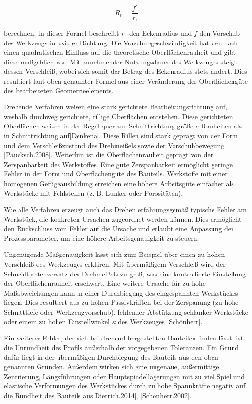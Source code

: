 \begin{equation*}
	R_{t}=\frac{f^{2}}{r_{\epsilon}}
\end{equation*}

berechnen. In dieser Formel beschreibt $r_{\epsilon}$ den Eckenradius und $f$ den Vorschub des Werkzeugs in axialer Richtung. Die Vorschubgeschwindigkeit hat demnach einen quadratischen Einfluss auf die theoretische Oberflächenrauheit und gibt diese maßgeblich vor. Mit zunehmender Nutzungsdauer des Werkzeuges steigt dessen Verschleiß, wobei sich somit der Betrag des Eckenradius stets ändert. Dies resultiert laut oben genannter Formel aus einer Veränderung der Oberflächengüte des bearbeiteten Geometrieelements. 

Drehende Verfahren weisen eine stark gerichtete Bearbeitungsrichtung auf, weshalb durchweg gerichtete, rillige Oberflächen entstehen. Diese gerichteten Oberflächen weisen in der Regel quer zur Schnittrichtung größere Rauheiten als in Schnittrichtung auf[Denkena].
Diese Rillen sind stark geprägt von der Form und dem Verschleißzustand des Drehmeißels sowie der Vorschubbewegung [Paucksch.2008].
Weiterhin ist die Oberflächenrauheit geprägt von der Zerspanbarkeit des Werkstoffes. Eine gute Zerspanbarkeit ermöglicht geringe Fehler in der Form und Oberflächengüte des Bauteils. Werkstoffe mit einer homogenen Gefügeausbildung erreichen eine höhere Arbeitsgüte einfacher als Werkstücke mit Fehlstellen (z. B. Lunker oder Porositäten).

Wie alle Verfahren erzeugt auch das Drehen erfahrungsgemäß typische Fehler am Werkstück, die konkreten Ursachen zugeordnet werden können. Dies ermöglicht den Rückschluss vom Fehler auf die Ursache und erlaubt eine Anpassung der Prozessparameter, um eine höhere Arbeitsgenauigkeit zu steuern. 

Ungenügende Maßgenauigkeit lässt sich zum Beispiel über einen zu hohen Verschleiß des Werkzeuges erklären. Mit übermäßigem Verschleiß wird der Schneidkantenversatz des Drehmeißels zu groß, was eine kontrollierte Einstellung der Oberflächenrauheit erschwert. Eine weitere Ursache für zu hohe Maßabweichungen kann in einer Durchbiegung des eingespannten Werkstückes liegen. Dies resultiert aus zu hohen Passivkräften bei der Zerspanung (zu hohe Schnitttiefe oder Werkzeugvorschub), fehlender Abstützung schlanker Werkstücke oder einem zu hohen Einstellwinkel $\kappa$ des Werkzeuges [Schönherr].

Ein weiterer Fehler, der sich bei drehend hergestellten Bauteilen finden lässt, ist die Unrundheit des Profils außerhalb der vorgegebenen Toleranzen. Ein Grund dafür liegt in der übermäßigen Durchbiegung des Bauteils aus den oben genannten Gründen. Außerdem wirken sich eine ungenaue, außermittige Zentrierung, Längsführungen oder Hauptspindellagerungen mit zu viel Spiel und elastische Verformungen des Werkstückes durch zu hohe Spannkräfte negativ auf die Rundheit des Bauteils aus[Dietrich.2014], [Schönherr.2002]. 

